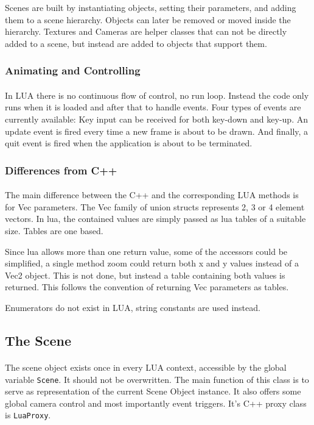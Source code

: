 Scenes are built by instantiating objects, setting their parameters, and adding them to a scene hierarchy.
Objects can later be removed or moved inside the hierarchy.
Textures and Cameras are helper classes that can not be directly added to a scene,
but instead are added to objects that support them.

\subsubsection{Animating and Controlling}
\paragraph{}
In LUA there is no continuous flow of control, no run loop. Instead the code only runs when it is loaded and after that to handle events.
Four types of events are currently available: Key input can be received for both key-down and key-up. An update event is fired every time a new frame is about to be drawn. And finally, a quit event is fired when the application is about to be terminated.

\subsubsection{Differences from C++}
\paragraph{}
The main difference between the C++ and the corresponding LUA methods is for Vec parameters.
The Vec family of union structs represents 2, 3 or 4 element vectors.
In lua, the contained values are simply passed as lua tables of a suitable size.
Tables are one based.

Since lua allows more than one return value, some of the accessors could be simplified, a single method zoom could return both x and y values instead of a Vec2 object.
This is not done, but instead a table containing both values is returned.
This follows the convention of returning Vec parameters as tables.

Enumerators do not exist in LUA, string constants are used instead.

\subsection{The Scene}
\paragraph{}
The scene object exists once in every LUA context, accessible by the global variable \texttt{Scene}. It should not be overwritten.
The main function of this class is to serve as representation of the current Scene Object instance.
It also offers some global camera control and most importantly event triggers.
It's C++ proxy class is \texttt{LuaProxy}.

